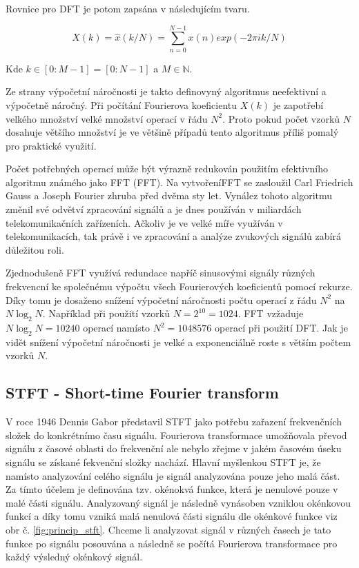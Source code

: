   Rovnice pro \acs{DFT} je potom zapsána v následujícím tvaru. 

  \begin{equation}
    X(k) = \hat{x}(k/N) = \sum_{n = 0}^{N - 1} x(n) exp(-2 \pi i k/N)
    \label{rov:DFT}
  \end{equation}

  Kde $ k \in [0:M - 1] = [0:N - 1] $ a $ M \in \mathbb{N}$.

  Ze strany výpočetní náročnosti je takto definovyný algoritmus neefektivní a výpočetně náročný.
  Při počítání Fourierova koeficientu $X(k)$ je zapotřebí velkého množství velké množství operací v řádu $N^2$.
  Proto pokud počet vzorků $N$ dosahuje většího množství je ve většině případů tento algoritmus příliš pomalý pro praktické využití.

  Počet potřebných operací může být výrazně redukován použitím efektivního algoritmu známého jako \acs{FFT} (\acl{FFT}).
  Na vytvoření\acs{FFT} se zasloužil Carl Friedrich Gauss a Joseph Fourier zhruba před dvěma sty let.
  Vynález tohoto algoritmu změnil své odvětví zpracování signálů a je dnes používán v miliardách telekomunikačních zařízeních.
  Ačkoliv je ve velké míře využíván v telekomunikacích, tak právě i ve zpracování a analýze zvukových signálů zabírá důležitou roli.

  Zjednodušeně \acs{FFT} využívá redundace napříč sinusovými signály různých frekvencní ke společnému výpočtu všech Fourierových koeficientů pomocí rekurze.
  Díky tomu je dosaženo snížení výpočetní náročnosti počtu operací z řádu $N^2$ na $N\log_2 N$.
  Například při použití vzorků $N = 2^10 = 1024$. \acs{FFT} vzžaduje $N\log_2N = 10240 $ operací namísto
  $N^2 = 1048576$ operací při použití \acs{DFT}. Jak je vidět snížení výpočetní náročnosti je velké a exponenciálně roste s větším počtem vzorků $N$.
  
  \subsection{STFT - Short-time Fourier transform} \label{sec:STFT}

  V roce 1946 Dennis Gabor představil \acs{STFT} jako potřebu zařazení frekvenčních složek do konkrétnímo času signálu.
  Fourierova transformace umožňovala převod signálu z časové oblasti do frekvenční ale nebylo zřejme v jakém časovém úseku signálu se získané fekvenční složky nachází.
  Hlavní myšlenkou \acs{STFT} je, že namísto analyzování celého signálu je signál analyzována pouze jeho malá část.
  Za tímto účelem je definována tzv. okénokvá funkce, která je nenulové pouze v malé části signálu.
  Analyzovaný signál je následně vynásoben vzniklou okénkovou funkcí a díky tomu vzniká malá nenulová části signálu dle okénkové funkce viz obr č. \ref*{fig:princip_stft}.
  Chceme li analyzovat signál v různých časech je tato funkce po signálu posouvána a následně se počítá Fourierova transformace pro každý výsledný okénkový signál.

